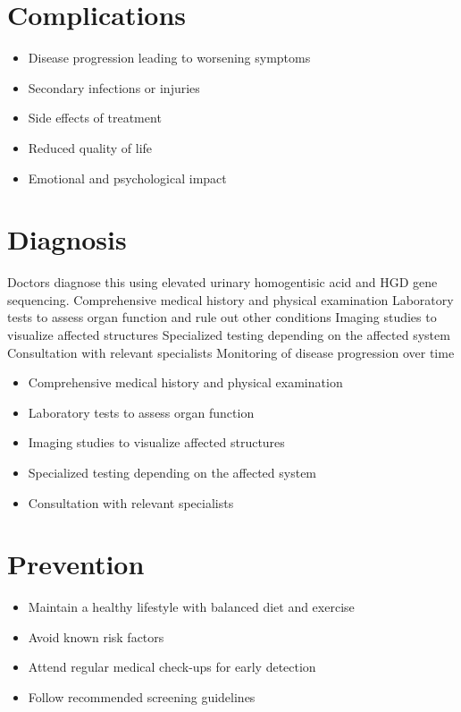 \section{Complications}
\begin{itemize}[noitemsep]
  \item Disease progression leading to worsening symptoms
  \item Secondary infections or injuries
  \item Side effects of treatment
  \item Reduced quality of life
  \item Emotional and psychological impact
\end{itemize}
\section{Diagnosis}
Doctors diagnose this using elevated urinary homogentisic acid and HGD gene sequencing. Comprehensive medical history and physical examination Laboratory tests to assess organ function and rule out other conditions Imaging studies to visualize affected structures Specialized testing depending on the affected system Consultation with relevant specialists Monitoring of disease progression over time

\begin{itemize}[noitemsep]
  \item Comprehensive medical history and physical examination
  \item Laboratory tests to assess organ function
  \item Imaging studies to visualize affected structures
  \item Specialized testing depending on the affected system
  \item Consultation with relevant specialists
\end{itemize}
\section{Prevention}
\begin{itemize}[noitemsep]
  \item Maintain a healthy lifestyle with balanced diet and exercise
  \item Avoid known risk factors
  \item Attend regular medical check-ups for early detection
  \item Follow recommended screening guidelines
\end{itemize}
